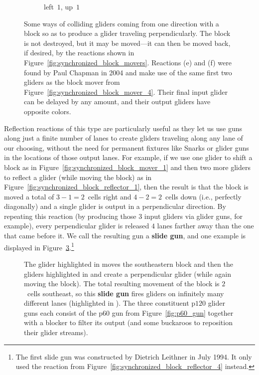 \begin{figure}[!htb]
\begin{subfigure}{0.32\textwidth}
		\caption{left~$1$, up~$1$}
		\label{fig:synchronized_block_reflector_6}
	\end{subfigure}
	\caption{Some ways of colliding gliders coming from one direction with a block so as to produce a glider traveling perpendicularly. The block is not destroyed, but it may be moved---it can then be moved back, if desired, by the reactions shown in Figure~\ref{fig:synchronized_block_movers}. Reactions (e) and (f) were found by Paul Chapman in 2004 and make use of the same first two gliders as the block mover from Figure~\ref{fig:synchronized_block_mover_4}. Their final input glider can be delayed by any amount, and their output gliders have opposite colors.}\label{fig:synchronized_block_reflectors}
\end{figure}

Reflection reactions of this type are particularly useful as they let us use guns along just a finite number of lanes to create gliders traveling along any lane of our choosing, without the need for permanent fixtures like Snarks or glider guns in the locations of those output lanes. For example, if we use one glider to shift a block as in Figure~\ref{fig:synchronized_block_mover_1} and then two more gliders to reflect a glider (while moving the block) as in Figure~\ref{fig:synchronized_block_reflector_1}, then the result is that the block is moved a total of $3-1=2$~cells right and $4-2=2$~cells down (i.e., perfectly diagonally) and a single glider is output in a perpendicular direction. By repeating this reaction (by producing those $3$ input gliders via glider guns, for example), every perpendicular glider is released $4$ lanes farther away than the one that came before it. We call the resulting gun a \textbf{slide gun}, and one example is displayed in Figure~\ref{fig:slide_gun}.\footnote{The first slide gun was constructed by Dietrich Leithner in July 1994. It only used the reaction from Figure~\ref{fig:synchronized_block_reflector_4} instead.}

\begin{figure}[!htb]
	\centering
	\caption{The glider highlighted in  moves the southeastern block and then the gliders highlighted in  and  create a perpendicular glider (while again moving the block). The total resulting movement of the block is $2$~cells southeast, so this \textbf{slide gun} fires gliders on infinitely many different lanes (highlighted in ). The three constituent p$120$ glider guns each consist of the p$60$ gun from Figure~\ref{fig:p60_gun} together with a blocker to filter its output (and some buckaroos to reposition their glider streams).}\label{fig:slide_gun}
\end{figure}

